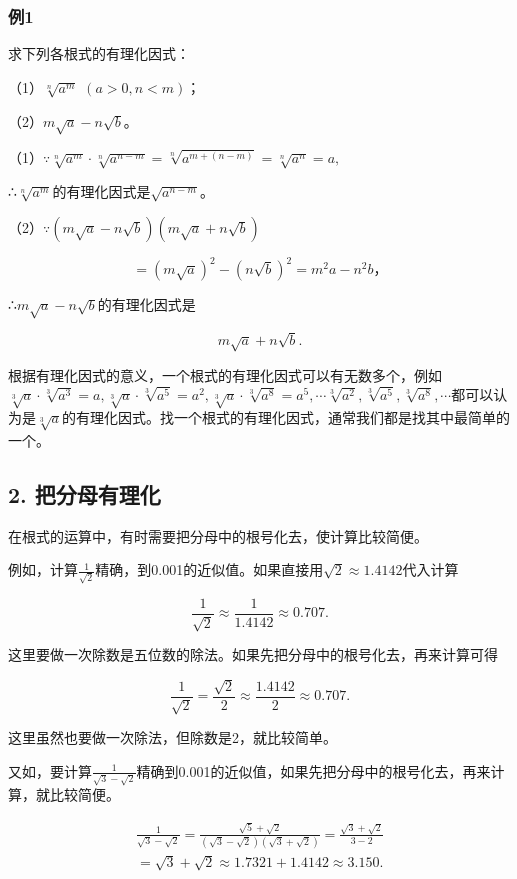 \subsubsection{例1}

求下列各根式的有理化因式：

（1）\(\sqrt[n]{a^m}\) \((a > 0, n < m)\)；

（2）\(m\sqrt{a} - n\sqrt{b}\)。

（1）\(\because \sqrt[n]{a^m} \cdot \sqrt[n]{a^{n - m}} = \sqrt[n]{a^{m + (n - m)}} = \sqrt[n]{a^n} = a,\)

∴\(\sqrt[n]{a^{m}}\)的有理化因式是\(\sqrt{a^{n-m}}\)。

（2）\(\because (m\sqrt{a} - n\sqrt{b})(m\sqrt{a} + n\sqrt{b})\)

\[
= (m \sqrt {a}) ^ {2} - (n \sqrt {b}) ^ {2} = m ^ {2} a - n ^ {2} b\text{，}
\]

∴\(m\sqrt{a}-n\sqrt{b}\)的有理化因式是

\[
m \sqrt {a} + n \sqrt {b}.
\]

根据有理化因式的意义，一个根式的有理化因式可以有无数多个，例如\(\sqrt[3]{a} \cdot \sqrt[3]{a^3} = a, \sqrt[3]{a} \cdot \sqrt[3]{a^5} = a^2, \sqrt[3]{a} \cdot \sqrt[3]{a^8} = a^5, \cdots \sqrt[3]{a^2}, \sqrt[3]{a^5}, \sqrt[3]{a^8}, \cdots\)都可以认为是\(\sqrt[3]{a}\)的有理化因式。找一个根式的有理化因式，通常我们都是找其中最简单的一个。

\subsection{2. 把分母有理化}

在根式的运算中，有时需要把分母中的根号化去，使计算比较简便。

例如，计算\(\frac{1}{\sqrt{2}}\)精确，到0.001的近似值。如果直接用\(\sqrt{2}\approx 1.4142\)代入计算

\[
\frac{1}{\sqrt {2}} \approx \frac{1}{1.4142} \approx 0.707.
\]

这里要做一次除数是五位数的除法。如果先把分母中的根号化去，再来计算可得

\[
\frac{1}{\sqrt {2}} = \frac{\sqrt {2}}{2} \approx \frac{1.4142}{2} \approx 0.707.
\]

这里虽然也要做一次除法，但除数是2，就比较简单。

又如，要计算\(\frac{1}{\sqrt{3} - \sqrt{2}}\)精确到0.001的近似值，如果先把分母中的根号化去，再来计算，就比较简便。

\[
\begin{array}{l} \frac{1}{\sqrt {3} - \sqrt {2}} = \frac{\sqrt {5} + \sqrt {2}}{(\sqrt {3} - \sqrt {2}) (\sqrt {3} + \sqrt {2})} = \frac{\sqrt {3} + \sqrt {2}}{3 - 2} \\ = \sqrt {3} + \sqrt {2} \approx 1.7321 + 1.4142 \approx 3.150. \\ \end{array}
\]

